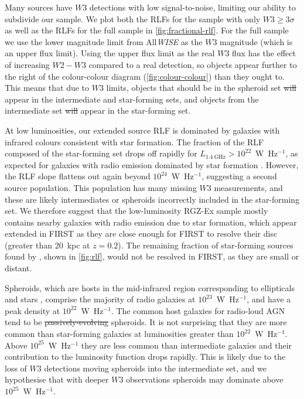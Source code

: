 \documentclass[11pt, a4paper]{book}
\providecommand{\DIFaddtex}[1]{{\protect\color{blue}\uwave{#1}}} %
\providecommand{\DIFdeltex}[1]{{\protect\color{red}\sout{#1}}}                      %
\providecommand{\DIFaddbegin}{} %
\providecommand{\DIFaddend}{} %
\providecommand{\DIFdelbegin}{} %
\providecommand{\DIFdelend}{} %
\providecommand{\DIFadd}[1]{\texorpdfstring{\DIFaddtex{#1}}{#1}} %
\providecommand{\DIFdel}[1]{\texorpdfstring{\DIFdeltex{#1}}{}} %
\newcommand{\DIFscaledelfig}{0.5}
\newlength{\DIFdelgraphicswidth} %
\newlength{\DIFdelgraphicsheight} %
\newcommand{\DIFaddincludegraphics}[2][]{{\color{blue}\fbox{\DIFOincludegraphics[#1]{#2}}}} %
\newcommand{\DIFdelincludegraphics}[2][]{%
\sbox{\DIFdelgraphicsbox}{\DIFOincludegraphics[#1]{#2}}%
\settoboxwidth{\DIFdelgraphicswidth}{\DIFdelgraphicsbox} %
\settoboxtotalheight{\DIFdelgraphicsheight}{\DIFdelgraphicsbox} %
\scalebox{\DIFscaledelfig}{%
\parbox[b]{\DIFdelgraphicswidth}{\usebox{\DIFdelgraphicsbox}\\[-\baselineskip] \rule{\DIFdelgraphicswidth}{0em}}\llap{\resizebox{\DIFdelgraphicswidth}{\DIFdelgraphicsheight}{%
\setlength{\unitlength}{\DIFdelgraphicswidth}%
\begin{picture}(1,1)%
\thicklines\linethickness{2pt} %
{\color[rgb]{1,0,0}\put(0,0){\framebox(1,1){}}}%
{\color[rgb]{1,0,0}\put(0,0){\line( 1,1){1}}}%
{\color[rgb]{1,0,0}\put(0,1){\line(1,-1){1}}}%
\end{picture}%
}\hspace*{3pt}}} %
} %
\DeclareRobustCommand{\DIFaddbegin}{\DIFOaddbegin \let\includegraphics\DIFaddincludegraphics} %
\DeclareRobustCommand{\DIFaddend}{\DIFOaddend \let\includegraphics\DIFOincludegraphics} %
\DeclareRobustCommand{\DIFdelbegin}{\DIFOdelbegin \let\includegraphics\DIFdelincludegraphics} %
\DeclareRobustCommand{\DIFdelend}{\DIFOaddend \let\includegraphics\DIFOincludegraphics} %
\begin{document}
      Many sources have $W3$ detections with low signal-to-noise, limiting our ability to subdivide our sample. We plot both the RLFs for the sample with only $W3 \geq 3 \sigma$ as well as the RLFs for the full sample in \autoref{fig:fractional-rlf}. For the full sample we use the lower magnitude limit from All\emph{WISE} as the $W3$ magnitude (which is an upper flux limit). Using the upper flux limit as the real $W3$ flux has the effect of increasing $W2 - W3$ compared to a real detection, so objects appear further to the right of the colour-colour diagram (\autoref{fig:colour-colour}) than they ought to. This means that due to $W3$ limits, objects that should be in the spheroid set \DIFdelbegin \DIFdel{will }\DIFdelend \DIFaddbegin \DIFadd{instead }\DIFaddend appear in the intermediate and star-forming sets, and objects from the intermediate set \DIFdelbegin \DIFdel{will }\DIFdelend \DIFaddbegin \DIFadd{instead }\DIFaddend appear in the star-forming set.

      At low luminosities, our extended source RLF is dominated by galaxies with infrared
      colours consistent with star formation. The fraction
      of the RLF composed of the star-forming set drops off rapidly for
      $L_{1.4\ \mathrm{GHz}} > 10^{22}$~W~Hz$^{-1}$, as expected for galaxies with radio emission
      dominated by star formation \citep[e.g.][]{mauch07rlf}. However, the RLF slope flattens out again beyond $10^{24}$~W~Hz$^{-1}$, suggesting a second source population. This population has many missing $W3$ measurements, and these are likely intermediates or spheroids incorrectly included in the star-forming set. We therefore suggest that the
      low-luminosity RGZ-Ex sample mostly contains nearby galaxies with radio
      emission due to star formation, which appear extended in FIRST as they
      are close enough for FIRST to resolve their
      disc (greater than 20~kpc at $z = 0.2$). The remaining fraction of star-forming sources found by
      \citet{mauch07rlf}, shown in
      \autoref{fig:rlf}, would not be resolved in FIRST, as they are small or
      distant.

      Spheroids, which are hosts in the mid-infrared region corresponding to ellipticals and stars \citep{wright10wise}, comprise the majority of radio galaxies at $10^{23}$~W~Hz$^{-1}$,
      and have a peak density at $10^{22}$~W~Hz$^{-1}$. The common host galaxies for radio-loud AGN tend to be \DIFdelbegin \DIFdel{passively-evolving }\DIFdelend \DIFaddbegin \DIFadd{passively evolving }\DIFaddend spheroids. It is not surprising that they are more common than star-forming galaxies at luminosities greater than $10^{22}$~W~Hz$^{-1}$. Above
      $10^{25}$~W~Hz$^{-1}$ they are less common than intermediate galaxies and
      their contribution to the luminosity function drops rapidly. This is likely due to the loss of $W3$ detections moving spheroids into the intermediate set, and we hypothesise that with deeper $W3$ observations spheroids may dominate above $10^{25}$~W~Hz$^{-1}$.
\end{document}
